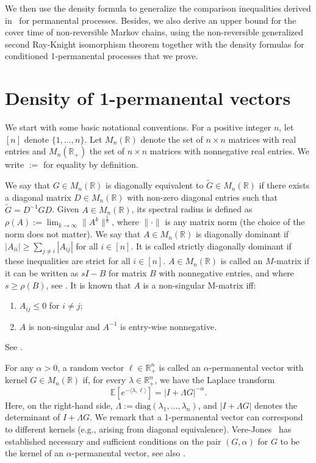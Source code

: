 \documentclass[a4paper, 11pt]{article}
\newcommand{\E}{\mathbb{E}}
\newcommand{\compi}{\textnormal{i}}
\begin{document}
We then use the density formula to generalize the comparison inequalities derived in~\cite{eisenbaum13} for permanental processes. Besides, we also derive an upper bound for the cover time of non-reversible Markov chains, using the non-reversible
generalized second Ray-Knight isomorphism theorem together with the density formulas for conditioned 1-permanental processes that we prove.

\section{Density of 1-permanental vectors}

We start with some basic notational conventions. For a positive integer $n$, let $[n]$ denote $\{1, \ldots, n\}$. Let $M_n(\mathbb{R})$ denote the set of $n \times n$ matrices with real entries and $M_n(\mathbb{R}_+)$ the set of $n \times n$ matrices with nonnegative real entries. We write $:=$ for equality by definition.

We say that $G \in M_n(\mathbb{R})$ is diagonally equivalent to $\tilde{G} \in M_n(\mathbb{R})$ if there exists a diagonal matrix $D \in M_n(\mathbb{R})$ with non-zero diagonal entries such that $\tilde{G}=D^{-1}GD$.
Given $A\in M_n(\mathbb{R})$, its spectral radius is defined as $\rho(A):=\lim_{k\rightarrow\infty}\|A^k\|^{\frac{1}{k}}$, where $\|\cdot \|$ is any matrix norm (the choice of the norm does not matter). We say that $A\in M_n(\mathbb{R})$ is diagonally dominant if $|A_{ii}|\geq\sum_{j\neq i}|A_{ij}|$ for all $i\in[n]$. It is called strictly diagonally dominant if these inequalities are strict for all $i\in[n]$. $A\in M_n(\mathbb{R})$ is called an $M$-matrix if it can be written as $sI- B$ for matrix $B$ with nonnegative entries, and where $s \ge \rho(B)$, see \cite[pg. 176]{plemmons77}. It is known that
$A$ is a non-singular M-matrix iff:
\begin{enumerate}
    \item $A_{ij}\leq 0$ for $i\neq j$;
    \item $A$ is non-singular and $A^{-1}$ is entry-wise nonnegative.
\end{enumerate}
See \cite[Criterion F15, pg. 180]{plemmons77}.

For any $\alpha>0$, a random vector $\ell\in\mathbb{R}_+^n$ is called an $\alpha$-permanental vector with kernel $G \in M_n(\mathbb{R})$ if, for
every $\lambda\in\mathbb{R}_{+}^n$, we have the Laplace transform
\[\E[e^{-\langle \lambda, \ell\rangle}]=|I+\Lambda G|^{-\alpha}.\]
Here, on the right-hand side, $\Lambda := \mbox{diag}(\lambda_1, \ldots, \lambda_n)$, and $|I+\Lambda G|$ denotes the determinant of $I+\Lambda G$. We remark that a 1-permanental vector can correspond to different kernels (e.g., arising from diagonal equivalence). Vere-Jones~\cite{verejones97} has established necessary and sufficient conditions on the pair $(G, \alpha)$ for $G$ to be the kernel of an $\alpha$-permanental vector, see also \cite[Sec. 2]{eisenbaum17}.
\end{document}
